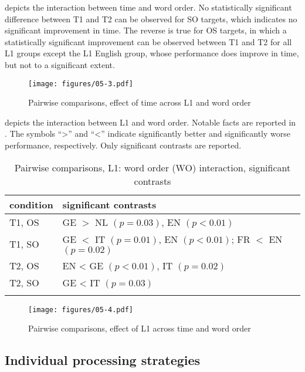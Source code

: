  depicts the interaction between time and word order. No statistically significant difference between T1 and T2 can be observed for SO targets, which indicates no significant improvement in time. The reverse is true for OS targets, in which a statistically significant improvement can be observed between T1 and T2 for all L1 groups except the L1 English group, whose performance does improve in time, but not to a significant extent.

\begin{figure}[p]
    \texttt{[image: figures/05-3.pdf]}
    \caption{Pairwise comparisons, effect of time across L1 and word order}
    \label{fig:05:3}
\end{figure}

 depicts the interaction between L1 and word order. Notable facts are reported in . The symbols “>” and “<” indicate significantly better and significantly worse performance, respectively. Only significant contrasts are reported.

\begin{table}
    \begin{tabularx}{\textwidth}{XX}
    \lsptoprule
    condition & significant contrasts\\
    \midrule
    T1, OS & GE $>$ NL $(p = 0.03)$, EN $(p < 0.01)$\\
    \tablevspace
    T1, SO & GE $<$ IT $(p = 0.01)$, EN $(p < 0.01)$;\newline
            FR $<$ EN $(p = 0.02)$\\
    \tablevspace
    T2, OS & EN < GE $(p < 0.01)$, IT $(p = 0.02)$\\
    \tablevspace
    T2, SO & GE < IT $(p = 0.03)$\\
    \lspbottomrule
    \end{tabularx}
    \caption{Pairwise comparisons, L1: word order (WO) interaction, significant contrasts}
    \label{tab:05:5}
\end{table}

\begin{figure}[p]
    \texttt{[image: figures/05-4.pdf]}
    \caption{Pairwise comparisons, effect of L1 across time and word order}
    \label{fig:05:4}
\end{figure}
\clearpage

\subsection{Individual processing strategies}\label{sec:05:2.3}

